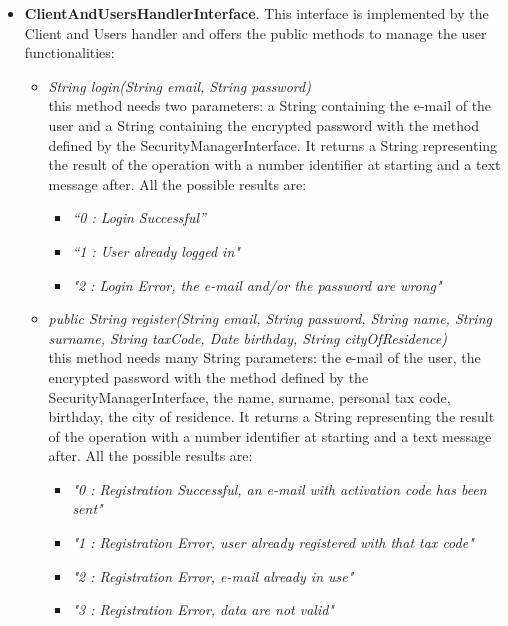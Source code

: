 \documentclass[\mainpath/main]{subfiles}
\begin{document}
\begin{itemize}
	\item \textbf{ClientAndUsersHandlerInterface}. This interface is implemented by the Client and Users handler and offers the public methods to manage the user functionalities:
	\begin{itemize}
		\item \textit{String login(String email, String password)}\\
		this method needs two parameters: a String containing the e-mail of the user and a String containing the encrypted password with the method defined by the SecurityManagerInterface. It returns a String representing the result of the operation with a number identifier at starting and a text message after. All the possible results are:
		\begin{itemize}
			\item \textit{\textquotedblleft 0 : Login Successful\textquotedblright}
			\item \textit{\textquotedblleft 1 : User already logged in"}
			\item \textit{"2 : Login Error, the e-mail and/or the password are wrong"}
		\end{itemize}
		
	\end{itemize}
	\begin{itemize}
		\item \textit{public String register(String email, String password, String name, String surname, String taxCode, Date birthday, String cityOfResidence)}\\
		this method needs many String parameters: the e-mail of the user, the encrypted password with the method defined by the SecurityManagerInterface, the name, surname, personal tax code, birthday, the city of residence. It returns a String representing the result of the operation with a number identifier at starting and a text message after. All the possible results are:
		\begin{itemize}
			\item \textit{"0 : Registration Successful, an e-mail with activation code has been sent"}
			\item \textit{"1 : Registration Error, user already registered with that tax code"}
			\item \textit{"2 : Registration Error, e-mail already in use"}
			\item \textit{"3 : Registration Error, data are not valid"}	
		\end{itemize}
		
	\end{itemize}	
	

\end{itemize}
\end{document}
